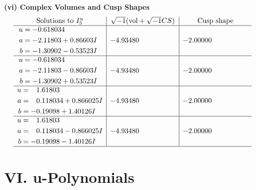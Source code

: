 \documentclass[1p]{elsarticle_modified}
\theoremstyle{definition}
\newcommand{\I}{\sqrt{-1}}
\begin{document}
\newpage\flushleft \textbf{(vi) Complex Volumes and Cusp Shapes}
$$\begin{array}{c|c|c}  
\text{Solutions to }I^u_{5}& \I (\text{vol} + \sqrt{-1}CS) & \text{Cusp shape}\\
 \hline 
\begin{aligned}
u &= -0.618034\phantom{ +0.000000I} \\
a &= -2.11803 + 0.86603 I \\
b &= -1.30902 - 0.53523 I\end{aligned}
 & -4.93480\phantom{ +0.000000I} & -2.00000\phantom{ +0.000000I} \\ \hline\begin{aligned}
u &= -0.618034\phantom{ +0.000000I} \\
a &= -2.11803 - 0.86603 I \\
b &= -1.30902 + 0.53523 I\end{aligned}
 & -4.93480\phantom{ +0.000000I} & -2.00000\phantom{ +0.000000I} \\ \hline\begin{aligned}
u &= \phantom{-}1.61803\phantom{ +0.000000I} \\
a &= \phantom{-}0.118034 + 0.866025 I \\
b &= -0.19098 + 1.40126 I\end{aligned}
 & -4.93480\phantom{ +0.000000I} & -2.00000\phantom{ +0.000000I} \\ \hline\begin{aligned}
u &= \phantom{-}1.61803\phantom{ +0.000000I} \\
a &= \phantom{-}0.118034 - 0.866025 I \\
b &= -0.19098 - 1.40126 I\end{aligned}
 & -4.93480\phantom{ +0.000000I} & -2.00000\phantom{ +0.000000I}\\
 \hline 
 \end{array}$$\newpage
\newpage\renewcommand{\arraystretch}{1}
\centering \section*{ VI. u-Polynomials}
\end{document}
